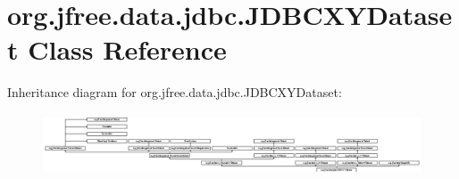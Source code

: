 \hypertarget{classorg_1_1jfree_1_1data_1_1jdbc_1_1_j_d_b_c_x_y_dataset}{}\section{org.\+jfree.\+data.\+jdbc.\+J\+D\+B\+C\+X\+Y\+Dataset Class Reference}
\label{classorg_1_1jfree_1_1data_1_1jdbc_1_1_j_d_b_c_x_y_dataset}
Inheritance diagram for org.\+jfree.\+data.\+jdbc.\+J\+D\+B\+C\+X\+Y\+Dataset\+:\begin{figure}[H]
\begin{center}
\leavevmode
\includegraphics[height=1.823362cm]{classorg_1_1jfree_1_1data_1_1jdbc_1_1_j_d_b_c_x_y_dataset}
\end{center}
\end{figure}
